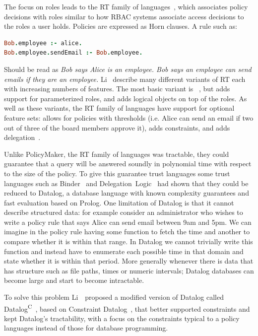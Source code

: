 \documentclass[thesis.tex]{subfiles}
\begin{document}
The focus on roles leads to the RT family of
languages~\cite{ninghui_li_design_2002}, which associates policy
decisions with roles similar to how \ac{RBAC} systems associate access
decisions to the roles a user holds.  Policies are expressed as Horn
clauses.  A rule such as:

\begin{lstlisting}[language=prolog]
Bob.employee :- alice.
Bob.employee.sendEmail :- Bob.employee.
\end{lstlisting}

Should be read as \emph{Bob says Alice is an employee.  Bob says an
employee can send emails if they are an employee.}  Li~\etal{}
describe many different variants of RT each with increasing numbers of
features.  The most basic variant is
~\cite{li_distributed_2003}, but  adds support for
parameterized roles, and  adds logical objects on top of the
roles.  As well as these variants, the RT family of languages have
support for optional feature sets:  allows for policies with
thresholds (i.e. Alice can send an email if two out of three of the
board members approve it),  adds constraints, and 
adds delegation~\cite{ninghui_li_design_2002}.

Unlike PolicyMaker, the RT family of languages was tractable, they could guarantee
that a query will be answered soundly in polynomial time with respect to the
size of the policy. To give this guarantee trust languages some trust languages
such as Binder~\cite{detreville_binder_2002} and
Delegation~Logic~\cite{li_delegation_2003,li_practically_2000} had shown that
they could be reduced to Datalog, a database language with known complexity
guarantees and fast evaluation based on Prolog. One limitation of Datalog is
that it cannot describe structured data: for example consider an administrator
who wishes to write a policy rule that says Alice can send email between 9am and
5pm. We can imagine in the policy rule having some function to fetch the time
and another to compare whether it is within that range. In Datalog we cannot
trivially write this function and instead have to enumerate each possible time
in that domain and state whether it is within that period. More generally
whenever there is data that has structure such as file paths, times or numeric
intervals; Datalog databases can become large and start to become intractable.

To solve this problem Li~\etal{}~proposed a modified version of
Datalog called Datalog\textsuperscript{C}~\cite{li_datalog_2003},
based on Constraint
Datalog~\cite{revesz_constraint_1995,revesz_safe_1998}, that better
supported constraints and kept Datalog's tractability, with a focus on
the constraints typical to a policy languages instead of those for
database programming.
\end{document}
